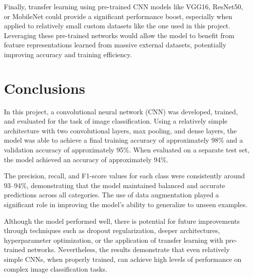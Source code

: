 \documentclass[10pt]{article}
\begin{document}
Finally, transfer learning using pre-trained CNN models like VGG16, ResNet50, or MobileNet could provide a significant performance boost, especially when applied to relatively small custom datasets like the one used in this project. Leveraging these pre-trained networks would allow the model to benefit from feature representations learned from massive external datasets, potentially improving accuracy and training efficiency. 


\section{Conclusions}

In this project, a convolutional neural network (CNN) was developed, trained, and evaluated for the task of image classification. Using a relatively simple architecture with two convolutional layers, max pooling, and dense layers, the model was able to achieve a final training accuracy of approximately 98\% and a validation accuracy of approximately 95\%. When evaluated on a separate test set, the model achieved an accuracy of approximately 94\%.

The precision, recall, and F1-score values for each class were consistently around 93--94\%, demonstrating that the model maintained balanced and accurate predictions across all categories. The use of data augmentation played a significant role in improving the model's ability to generalize to unseen examples.

Although the model performed well, there is potential for future improvements through techniques such as dropout regularization, deeper architectures, hyperparameter optimization, or the application of transfer learning with pre-trained networks. Nevertheless, the results demonstrate that even relatively simple CNNs, when properly trained, can achieve high levels of performance on complex image classification tasks. 




\end{document}
